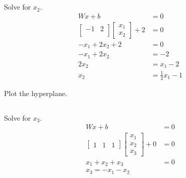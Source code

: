 \section{}

\subsection{}
Solve for $x_2$.
\begin{align*}
    Wx + b &= 0 \\
    \begin{bmatrix}
	-1 & 2 \\
    \end{bmatrix}
    \begin{bmatrix}
	x_1 \\
	x_2
    \end{bmatrix}
    + 2 
    &= 0 \\
    -x_1 + 2x_2 + 2 &= 0 \\
    -x_1 + 2x_2 &= -2 \\
    2x_2 &= x_1 - 2 \\
    x_2 &= \frac{1}{2}x_1 - 1  
\end{align*}

Plot the hyperplane. \\

\subsection{}

Solve for $x_3$.
\begin{align*}
    Wx + b &= 0 \\
    \begin{bmatrix}
	1 & 1 & 1
    \end{bmatrix}
    \begin{bmatrix}
	x_1 \\
	x_2 \\
	x_3
    \end{bmatrix}
    + 0
    &= 0 \\
    x_1 + x_2 + x_3 &= 0 \\
    x_3 = -x_1 - x_2 \\ 
\end{align*}

